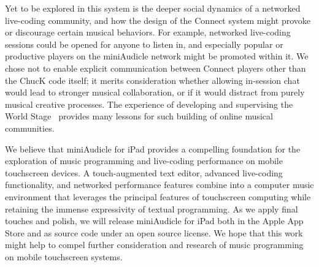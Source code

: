 \documentclass{article}
\begin{document}
Yet to be explored in this system is the deeper social dynamics of a networked live-coding community, and how the design of the Connect system might provoke or discourage certain musical behaviors. 
For example, networked live-coding sessions could be opened for anyone to listen in, and especially popular or productive players on the miniAudicle network might be promoted within it. 
We chose not to enable explicit communication between Connect players other than the ChucK code itself; it merits consideration whether allowing in-session chat would lead to stronger musical collaboration, or if it would distract from purely musical creative processes.  
The experience of developing and supervising the World Stage~\cite{wang2011world} provides many lessons for such building of online musical communities. 

We believe that miniAudicle for iPad provides a compelling foundation for the exploration of music programming and live-coding performance on mobile touchscreen devices. 
A touch-augmented text editor, advanced live-coding functionality, and networked performance features combine into a computer music environment that leverages the principal features of touchscreen computing while retaining the immense expressivity of textual programming. 
As we apply final touches and polish, we will release miniAudicle for iPad both in the Apple App Store and as source code under an open source license. 
We hope that this work might help to compel further consideration and research of music programming on mobile touchscreen systems. 



\end{document}
